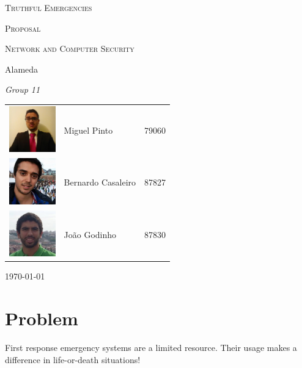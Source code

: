 \documentclass[a4paper,titlepage,11pt]{article}
\begin{document}
\begin{titlepage}
  \begin{center}
    {\scshape \huge Truthful Emergencies \par}
    \vspace{1cm}

    {\scshape \LARGE Proposal \par}
    \vspace{1.5cm}

    {\scshape \Large Network and Computer Security \par}
    \vspace{0.5cm}

    {\Large Alameda \par}
    \vfill

    {\itshape \Large Group 11 \par}
    \vfill

    \begin{tabular}{l l l}
      \includegraphics[width=20mm, height=20mm]{img/miguel.jpg} & Miguel Pinto & 79060\\
      \includegraphics[width=20mm, height=20mm]{img/bernardo.jpeg} & Bernardo Casaleiro & 87827\\
      \includegraphics[width=20mm, height=20mm]{img/joao.jpeg} & João Godinho & 87830\\
    \end{tabular}
    \vfill

    {\large \today\par}
  \end{center}
\end{titlepage}

\section{Problem}
First response emergency systems are a limited resource. Their usage makes a difference in life-or-death situations!
\end{document}
